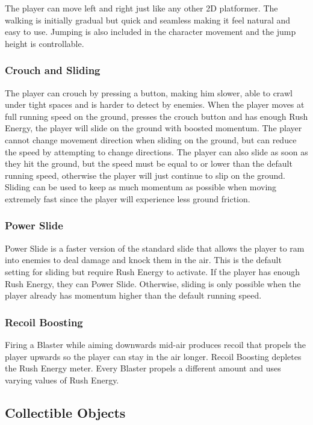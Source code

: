 \documentclass[12pt]{article}
\begin{document}
The player can move left and right just like any other 2D platformer. The walking is initially gradual but quick and seamless making it feel natural and easy to use. Jumping is also included in the character movement and the jump height is controllable.

\subsubsection{Crouch and Sliding}

The player can crouch by pressing a button, making him slower, able to crawl under tight spaces and is harder to detect by enemies. When the player moves at full running speed on the ground, presses the crouch button and has enough Rush Energy, the player will slide on the ground with boosted momentum. The player cannot change movement direction when sliding on the ground, but can reduce the speed by attempting to change directions. The player can also slide as soon as they hit the ground, but the speed must be equal to or lower than the default running speed, otherwise the player will just continue to slip on the ground. Sliding can be used to keep as much momentum as possible when moving extremely fast since the player will experience less ground friction. 

\subsubsection{Power Slide}

Power Slide is a faster version of the standard slide that allows the player to ram into enemies to deal damage and knock them in the air. This is the default setting for sliding but require Rush Energy to activate. If the player has enough Rush Energy, they can Power Slide. Otherwise, sliding is only possible when the player already has momentum higher than the default running speed. 

\subsubsection{Recoil Boosting}

Firing a Blaster while aiming downwards mid-air produces recoil that propels the player upwards so the player can stay in the air longer. Recoil Boosting depletes the Rush Energy meter. Every Blaster propels a different amount and uses varying values of Rush Energy. 

\subsection{Collectible Objects}
\end{document}
